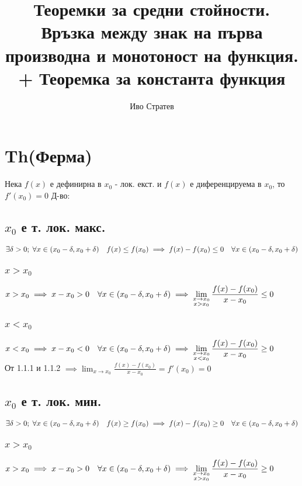 \documentclass{article}
\title{Теоремки за средни стойности. Връзка между знак на първа производна и монотоност на функция. + Теоремка за константа функция}
\author{Иво Стратев}
\newcommand{\spc}[0]{\quad}
\begin{document}
    \maketitle
    \section{Th(Ферма)}
    Нека \(f(x)\) е дефинирна в \(x_0\) - лок. екст. и \(f(x)\) е диференцируема в \(x_0\), то \(f'(x_0) = 0\)
    \bigbreak
    Д-во:
    \subsection{\(x_0\) е т. лок. макс.}
    \(\exists \delta > 0; \; \forall x \in (x_0 - \delta, x_0 + \delta) \spc f(x) \leq f(x_0)\\
    \implies f(x) - f(x_0) \leq 0 \spc \forall x \in (x_0 - \delta, x_0 + \delta)\)
    \subsubsection{\(x > x_0\)}
    \(x > x_0 \implies x - x_0 > 0 \spc \forall x \in (x_0 - \delta, x_0 + \delta)\\
    \implies \displaystyle\lim\limits_{\substack{x \to x_0 \\ x > x_0}} \frac{f(x) - f(x_0)}{x - x_0} \leq 0\)
    \subsubsection{\(x < x_0\)}
    \(x < x_0 \implies x - x_0 < 0 \spc \forall x \in (x_0 - \delta, x_0 + \delta)\\
    \implies \displaystyle\lim\limits_{\substack{x \to x_0 \\ x < x_0}} \frac{f(x) - f(x_0)}{x - x_0} \geq 0\)\\
    От 1.1.1 и 1.1.2 \(\implies \displaystyle\lim_{x \to x_0} \frac{f(x) - f(x_0)}{x - x_0} = f'(x_0) = 0\)
    \subsection{\(x_0\) е т. лок. мин.}
    \(\exists \delta > 0; \; \forall x \in (x_0 - \delta, x_0 + \delta) \spc f(x) \geq f(x_0)\\
    \implies f(x) - f(x_0) \geq 0 \spc \forall x \in (x_0 - \delta, x_0 + \delta)\)
    \subsubsection{\(x > x_0\)}
    \(x > x_0 \implies x - x_0 > 0 \spc \forall x \in (x_0 - \delta, x_0 + \delta)\\
    \implies \displaystyle\lim\limits_{\substack{x \to x_0 \\ x > x_0}} \frac{f(x) - f(x_0)}{x - x_0} \geq 0\)
\end{document}
